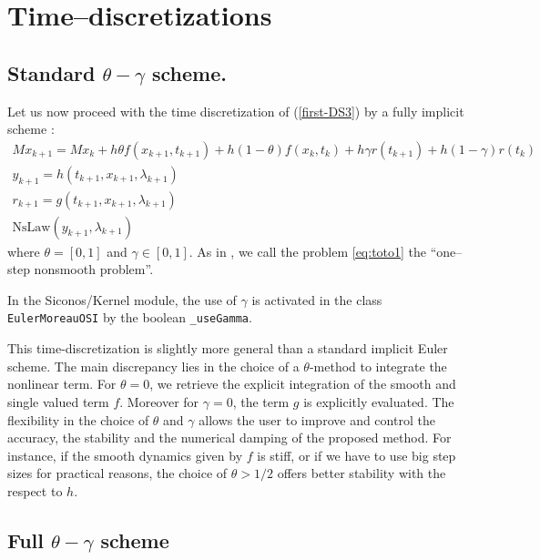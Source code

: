 \section{Time--discretizations}



\subsection{Standard $\theta-\gamma$ scheme.}
Let us now proceed with the time discretization of (\ref{first-DS3}) by a fully implicit scheme : 
\begin{equation}
  \begin{array}{l}
    \label{eq:toto1}
     M x_{k+1} = M x_{k} +h\theta f(x_{k+1},t_{k+1})+h(1-\theta) f(x_k,t_k) + h \gamma r(t_{k+1})
     + h(1-\gamma)r(t_k)  \\[2mm]
     y_{k+1} =  h(t_{k+1},x_{k+1},\lambda_{k+1}) \\[2mm]
     r_{k+1} =  g(t_{k+1},x_{k+1},\lambda_{k+1})\\[2mm]
     \mbox{NsLaw} ( y_{k+1} , \lambda_{k+1})
  \end{array}
\end{equation}
where $\theta = [0,1]$ and $\gamma \in [0,1]$. As in \cite{acary2008}, we call the problem \eqref{eq:toto1} the ``one--step nonsmooth problem''.

In the Siconos/Kernel module, the use of $\gamma$  is activated in the class {\tt EulerMoreauOSI} by the boolean {\tt \_useGamma}.



 This time-discretization is slightly more general than a standard implicit Euler scheme. The main discrepancy lies in the choice of a $\theta$-method to integrate the nonlinear term. For $\theta=0$, we retrieve the explicit integration of the smooth and  single valued term $f$. Moreover for $\gamma =0$, the term $g$ is explicitly evaluated. The flexibility in the choice of $\theta$ and $\gamma$ allows the user to improve and control the accuracy, the stability and the numerical damping of the proposed method. For instance, if the smooth dynamics given by $f$ is stiff, or if we have to use big step sizes for practical reasons, the choice of $\theta > 1/2$ offers better stability with the respect to $h$.

\subsection{Full $\theta-\gamma$ scheme}

